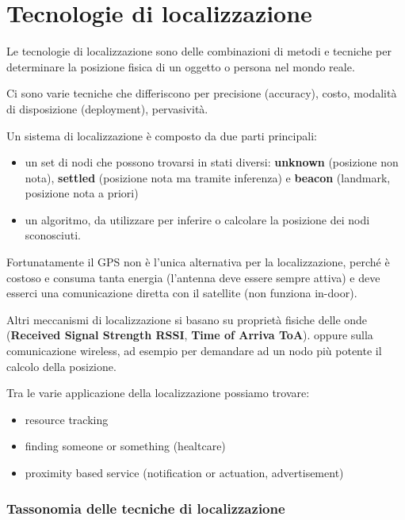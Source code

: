 \chapter{Tecnologie di localizzazione}

Le tecnologie di localizzazione sono delle combinazioni di metodi e tecniche
per determinare la posizione fisica di un oggetto o persona nel mondo reale.

Ci sono varie tecniche che differiscono per precisione (accuracy),
costo, modalità di disposizione (deployment), pervasività.

Un sistema di localizzazione è composto da due parti principali:

\begin{itemize}
\item un set di nodi che possono trovarsi in stati diversi: \textbf{unknown}
  (posizione non nota), \textbf{settled} (posizione nota ma tramite
  inferenza) e \textbf{beacon} (landmark, posizione nota a priori)

\item un algoritmo, da utilizzare per inferire o calcolare la posizione dei
  nodi sconosciuti.

\end{itemize}

Fortunatamente il GPS non è l'unica alternativa per la localizzazione,
perché è costoso e consuma tanta energia (l'antenna deve essere sempre
attiva) e deve esserci una comunicazione diretta con il satellite (non
funziona in-door).

Altri meccanismi di localizzazione si basano su proprietà fisiche delle
onde (\textbf{Received Signal Strength RSSI}, \textbf{Time of Arriva
ToA}). oppure sulla comunicazione wireless, ad esempio per demandare ad
un nodo più potente il calcolo della posizione.

Tra le varie applicazione della localizzazione possiamo trovare:

\begin{itemize}
\item resource tracking

\item finding someone or something (healtcare)

\item proximity based service (notification or actuation, advertisement)

\end{itemize}

\subsection[Tassonomia delle tecniche di localizzazione] {Tassonomia delle
tecniche di localizzazione}

